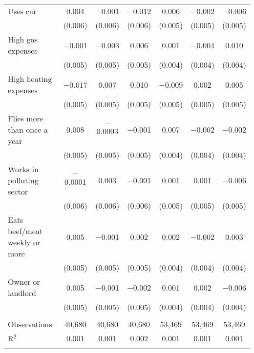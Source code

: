 \begin{tabular}{@{\extracolsep{5pt}}lcccccc}
  Uses car & 0.004 & $-$0.001 & $-$0.012 & 0.006 & $-$0.002 & $-$0.006 \\ 
  & (0.006) & (0.006) & (0.006) & (0.005) & (0.005) & (0.005) \\ 
  High gas expenses & $-$0.001 & $-$0.003 & 0.006 & 0.001 & $-$0.004 & 0.010 \\ 
  & (0.005) & (0.005) & (0.005) & (0.004) & (0.004) & (0.004) \\ 
  High heating expenses & $-$0.017 & 0.007 & 0.010 & $-$0.009 & 0.002 & 0.005 \\ 
  & (0.005) & (0.005) & (0.005) & (0.005) & (0.005) & (0.005) \\ 
  Flies more than once a year & 0.008 & $-$0.0003 & $-$0.001 & 0.007 & $-$0.002 & $-$0.002 \\ 
  & (0.005) & (0.005) & (0.005) & (0.004) & (0.004) & (0.004) \\ 
  Works in polluting sector & $-$0.0001 & 0.003 & $-$0.001 & 0.001 & 0.001 & $-$0.006 \\ 
  & (0.006) & (0.006) & (0.006) & (0.005) & (0.005) & (0.005) \\ 
  Eats beef/meat weekly or more & 0.005 & $-$0.001 & 0.002 & 0.002 & $-$0.002 & 0.003 \\ 
  & (0.005) & (0.005) & (0.005) & (0.004) & (0.004) & (0.004) \\ 
  Owner or landlord & 0.005 & $-$0.001 & $-$0.002 & 0.001 & 0.002 & $-$0.006 \\ 
  & (0.005) & (0.005) & (0.005) & (0.004) & (0.004) & (0.004) \\ 
 \hline \\[-1.8ex] 

Observations & 40,680 & 40,680 & 40,680 & 53,469 & 53,469 & 53,469 \\ 
R$^{2}$ & 0.001 & 0.001 & 0.002 & 0.001 & 0.001 & 0.001 \\ 
\hline 
\hline \\[-1.8ex] 
\end{tabular} 
